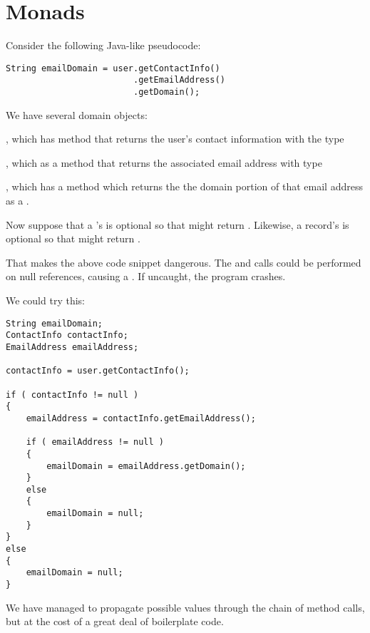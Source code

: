 \section{Monads}

Consider the following Java-like pseudocode:

\begin{lstlisting}
String emailDomain = user.getContactInfo()
                         .getEmailAddress()
                         .getDomain();
\end{lstlisting}

We have several domain objects:

\begin{notelist}
    \item {}, which has method  that returns the user's contact information with the type 
    \item {}, which as a method  that returns the associated email address with type
    \item {}, which has a method  which returns the the domain portion of that email address as a .
\end{notelist}

Now suppose that a 's  is optional so that  might return . Likewise,
a  record's  is optional so that  might return .

That makes the above code snippet dangerous. The  and  calls could be performed on null
references, causing a . If uncaught, the program crashes.

We could try this:

\begin{lstlisting}
String emailDomain;
ContactInfo contactInfo;
EmailAddress emailAddress;

contactInfo = user.getContactInfo();

if ( contactInfo != null )
{
    emailAddress = contactInfo.getEmailAddress();

    if ( emailAddress != null )
    {
        emailDomain = emailAddress.getDomain();
    }
    else
    {
        emailDomain = null;
    }
}
else
{
    emailDomain = null;
}
\end{lstlisting}

We have managed to propagate possible  values through the chain of method calls, but at the cost of a great deal of 
boilerplate code.

